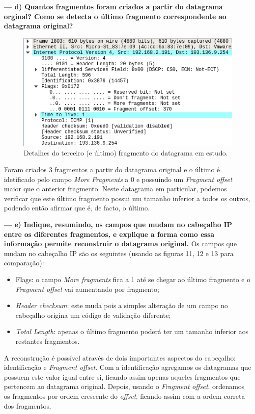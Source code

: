\documentclass[a4paper]{article}
\begin{document}
\vspace{1cm}

\textbf{--- d) Quantos fragmentos foram criados a partir do datagrama orginal? Como se detecta o último fragmento correspondente ao datagrama original?}\newline
\begin{figure}[!htb]
    \centering
    \includegraphics[scale=0.7]{pic15.png}\newline
    \caption{Detalhes do terceiro (e último) fragmento do datagrama em estudo.}
    \label{fig:my_label}
\end{figure}
Foram criados 3 fragmentos a partir do datagrama original e o último é idetificado pelo campo \textit{More Fragments} a 0 e possuindo um \textit{Fragment offset} maior que o anterior fragmento.\newline
Neste datagrama em particular, podemos verificar que este último fragmento possui um tamanho inferior a todos os outros, podendo então afirmar que é, de facto, o último.


\textbf{--- e) Indique, resumindo, os campos que mudam no cabeçalho IP entre os diferentes fragmentos, e explique a forma como essa informação permite reconstruir o datagrama original.}\newline
Os campos que mudam no cabeçalho IP são os seguintes (usando as figuras 11, 12 e 13 para comparação):
\begin{itemize}
    \item Flags: o campo \textit{More fragments} fica a 1 até se chegar ao último fragmento e o \textit{Fragment offset} vai aumentando por fragmento;
    \item \textit{Header checksum}: este muda pois a simples alteração de um campo no cabeçalho origina um código de validação diferente;
    \item \textit{Total Length}: apenas o último fragmento poderá ter um tamanho inferior aos restantes fragmentos.
\end{itemize}
A reconstrução é possível através de dois importantes aspectos do cabeçalho: identificação e \textit{Fragment offset}. Com a identificação agregamos os datagramas que possuem este valor igual entre si, ficando assim apenas aqueles fragmentos que pertencem ao datagrama original. Depois, usando o \textit{Fragment offset}, 
ordenamos os fragmentos por ordem crescente do \textit{offset}, ficando assim com a ordem correta dos fragmentos.
\end{document}
